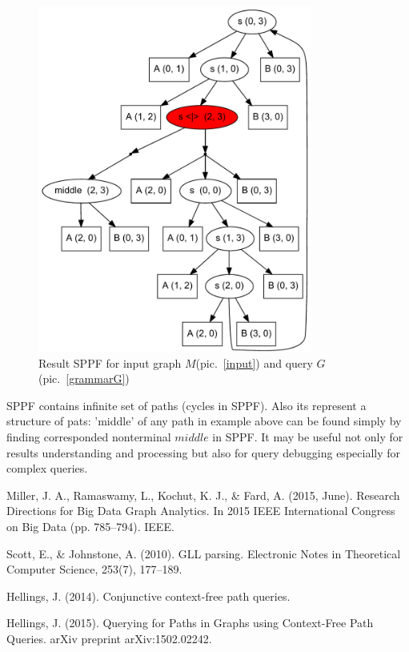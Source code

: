 \documentclass{sig-alternate} %
\begin{document}
\begin{figure}[h]
    \begin{center}
        \includegraphics[width=9cm]{dot/AnBn.pdf}
        \caption{Result SPPF for input graph $M$(pic.~\ref{input}) and query $G$(pic.~\ref{grammarG})}
        \label{SPPF}        
    \end{center}
\end{figure}


SPPF contains infinite set of paths (cycles in SPPF). Also its represent a structure of pats: 'middle' of any path in example above can be found 
simply by finding corresponded nonterminal $middle$ in SPPF. It may be useful not only for results understanding and processing but also for query debugging especially for complex queries. 


\begin{thebibliography}{9}
  
Miller, J. A., Ramaswamy, L., Kochut, K. J., \& Fard, A. (2015, June). Research Directions for Big Data Graph Analytics. In 2015 IEEE International Congress on Big Data (pp. 785--794). IEEE.

Scott, E., \& Johnstone, A. (2010). GLL parsing. Electronic Notes in Theoretical Computer Science, 253(7), 177--189.

Hellings, J. (2014). Conjunctive context-free path queries.

Hellings, J. (2015). Querying for Paths in Graphs using Context-Free Path Queries. arXiv preprint 
arXiv:1502.02242.


\end{thebibliography}
\end{document}
